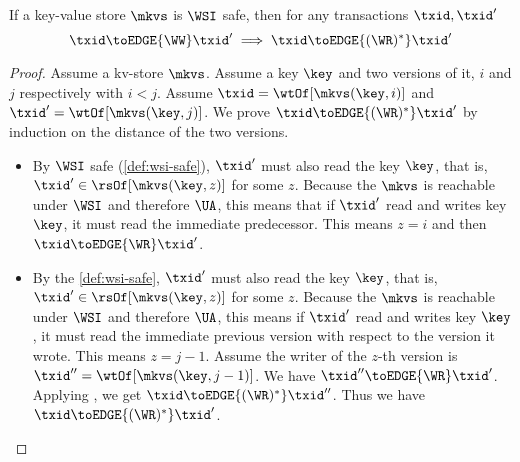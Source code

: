 \begin{lemma}
    \label{lem:wsi-ww-to-wr}
    If a key-value store \( \mkvs \) is \(\WSI\) safe, then for any transactions \( \txid, \txid' \)
    \[
        \txid \toEDGE{\WW} \txid' \implies \txid \toEDGE{(\WR)^*} \txid' 
    \]
\end{lemma}
\begin{proof}
    Assume a kv-store \( \mkvs \).
    Assume a key \( \key \) and two versions of it, \( i \) and \( j \) respectively with \( i< j\).
    Assume \(\txid = \wtOf[\mkvs(\key, i)] \) and \( \txid' = \wtOf[\mkvs(\key, j)] \).
    We prove \( \txid \toEDGE{(\WR)^*} \txid' \) by induction on the distance of the two versions.
    \begin{itemize}
    \item {}
    By \( \WSI \) safe (\cref{def:wsi-safe}), \( \txid' \) must also read the key \( \key \),
    that is, \( \txid' \in \rsOf[\mkvs(\key,z)]\) for some \( z \).
    Because the \( \mkvs \) is reachable under \( \WSI \) and therefore \( \UA \),
    this means that if \( \txid' \) read and writes key \( \key \), 
    it must read the immediate predecessor.
    This means \( z = i\) and then \( \txid \toEDGE{\WR} \txid' \).
    \item {}
    By the \cref{def:wsi-safe}, \( \txid' \) must also read the key \( \key \),
    that is, \( \txid' \in \rsOf[\mkvs(\key,z)]\) for some \( z \).
    Because the \( \mkvs \) is reachable under \( \WSI \) and therefore \( \UA \),
    this means if \( \txid' \) read and writes key \( \key \), 
    it must read the immediate previous version with respect to the version it wrote.
    This means \( z = j - 1\).
    Assume the writer of the \(z\)-th version is \( \txid'' = \wtOf[\mkvs(\key, j-1)]\).
    We have \( \txid'' \toEDGE{\WR} \txid' \).
    Applying \ih,  we get \( \txid \toEDGE{(\WR)^*} \txid'' \).
    Thus we have \( \txid \toEDGE{(\WR)^*} \txid' \).
    \end{itemize}
\end{proof}

